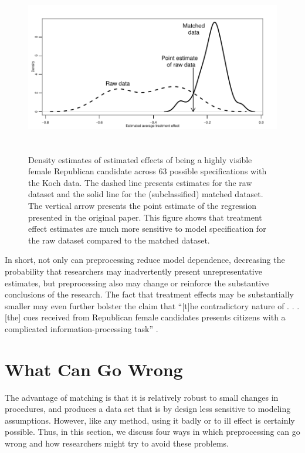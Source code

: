 \documentclass[11pt,titlepage]{article}
\begin{document}
\begin{figure}[t] 
 \begin{center}
   \includegraphics[height=3in,angle=0]{figs/kochdens.pdf}
 \end{center} 
 \vspace{-0.275in}
 \caption{Density estimates of estimated effects of
   being a highly visible female Republican candidate across 63
   possible specifications with the Koch data.  The dashed line
   presents estimates for the raw dataset and the solid line for the
   (subclassified) matched dataset.  The vertical arrow presents the
   point estimate of the regression presented in the original paper.
   This figure shows that treatment effect estimates are much more
   sensitive to model specification for the raw dataset compared to
   the matched dataset.}
 \label{fg:kochdens}
\end{figure}

In short, not only can preprocessing reduce model dependence,
decreasing the probability that researchers may inadvertently present
unrepresentative estimates, but preprocessing also may change or
reinforce the substantive conclusions of the research.  The fact that
treatment effects may be substantially smaller may even further
bolster the claim that ``[t]he contradictory nature of . . . [the]
cues received from Republican female candidates presents citizens with
a complicated information-processing task'' \citep[p. 460]{Koch02}.

\section{What Can Go Wrong}

The advantage of matching is that it is relatively robust to small
changes in procedures, and produces a data set that is by design less
sensitive to modeling assumptions.  However, like any method, using it
badly or to ill effect is certainly possible.  Thus, in this section,
we discuss four ways in which preprocessing can go wrong and how
researchers might try to avoid these problems.
\end{document}
